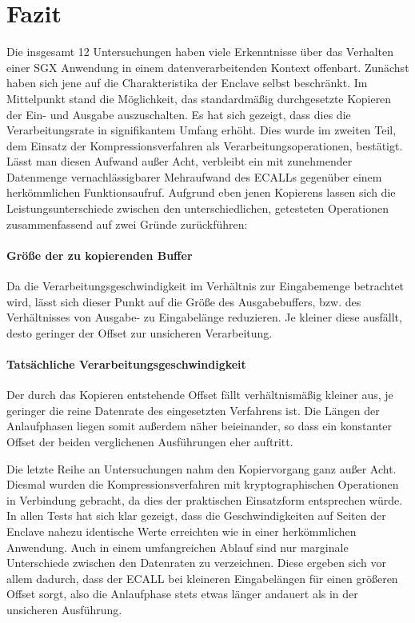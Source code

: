 \section{Fazit}

Die insgesamt 12 Untersuchungen haben viele Erkenntnisse über das Verhalten einer SGX Anwendung in einem datenverarbeitenden Kontext offenbart. Zunächst haben sich jene auf die Charakteristika der Enclave selbst beschränkt. Im Mittelpunkt stand die Möglichkeit, das standardmäßig durchgesetzte Kopieren der Ein- und Ausgabe auszuschalten. Es hat sich gezeigt, dass dies die Verarbeitungsrate in signifikantem Umfang erhöht. Dies wurde im zweiten Teil, dem Einsatz der Kompressionsverfahren als Verarbeitungsoperationen, bestätigt. Lässt man diesen Aufwand außer Acht, verbleibt ein mit zunehmender Datenmenge vernachlässigbarer Mehraufwand des ECALLs gegenüber einem herkömmlichen Funktionsaufruf. Aufgrund eben jenen Kopierens lassen sich die Leistungsunterschiede zwischen den unterschiedlichen, getesteten Operationen zusammenfassend auf zwei Gründe zurückführen:

\paragraph{Größe der zu kopierenden Buffer}
Da die Verarbeitungsgeschwindigkeit im Verhältnis zur Eingabemenge betrachtet wird, lässt sich dieser Punkt auf die Größe des Ausgabebuffers, bzw. des Verhältnisses von Ausgabe- zu Eingabelänge reduzieren. Je kleiner diese ausfällt, desto geringer der Offset zur unsicheren Verarbeitung.

\paragraph{Tatsächliche Verarbeitungsgeschwindigkeit}
Der durch das Kopieren entstehende Offset fällt verhältnismäßig kleiner aus, je geringer die reine Datenrate des eingesetzten Verfahrens ist. Die Längen der Anlaufphasen liegen somit außerdem näher beieinander, so dass ein konstanter Offset der beiden verglichenen Ausführungen eher auftritt.

Die letzte Reihe an Untersuchungen nahm den Kopiervorgang ganz außer Acht. Diesmal wurden die Kompressionsverfahren mit kryptographischen Operationen in Verbindung gebracht, da dies der praktischen Einsatzform entsprechen würde. In allen Tests hat sich klar gezeigt, dass die Geschwindigkeiten auf Seiten der Enclave nahezu identische Werte erreichten wie in einer herkömmlichen Anwendung. Auch in einem umfangreichen Ablauf sind nur marginale Unterschiede zwischen den Datenraten zu verzeichnen. Diese ergeben sich vor allem dadurch, dass der ECALL bei kleineren Eingabelängen für einen größeren Offset sorgt, also die Anlaufphase stets etwas länger andauert als in der unsicheren Ausführung.

